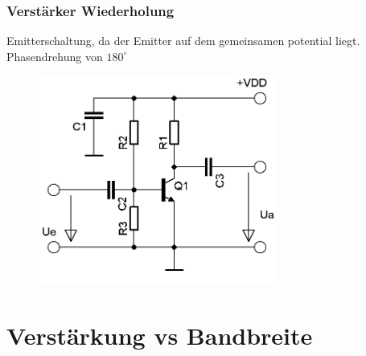 \begin{frame}
  \frametitle{Verstärker Wiederholung}
  \begin{center}
    \large Emitterschaltung, da der Emitter auf dem gemeinsamen potential liegt.\\
    Phasendrehung von $180^{\circ}$\\
    \begin{figure}
      \includegraphics[width=0.7\textwidth,height=.6\textheight,keepaspectratio]{a07/Transistor_Verstaerker_emitter.png}
    \end{figure}
  \end{center}
\end{frame}

\section*{Verstärkung vs Bandbreite}

